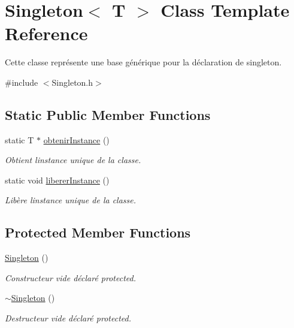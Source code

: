 \hypertarget{class_singleton}{}\section{Singleton$<$ T $>$ Class Template Reference}
\label{class_singleton}


Cette classe représente une base générique pour la déclaration de singleton.  




{\ttfamily \#include $<$Singleton.\+h$>$}

\subsection*{Static Public Member Functions}
\begin{DoxyCompactItemize}
\item 
static T $\ast$ \hyperlink{group__utilitaire_ga349c289d77c484b8b4a180843d968b46}{obtenir\+Instance} ()
\begin{DoxyCompactList}\small\item\em Obtient l\textquotesingle{}instance unique de la classe. \end{DoxyCompactList}\item 
static void \hyperlink{group__utilitaire_ga2b9ae943a004663d769be3f08ae35a0f}{liberer\+Instance} ()
\begin{DoxyCompactList}\small\item\em Libère l\textquotesingle{}instance unique de la classe. \end{DoxyCompactList}\end{DoxyCompactItemize}
\subsection*{Protected Member Functions}
\begin{DoxyCompactItemize}
\item 
\hypertarget{class_singleton_a923b995920da9c06590adb170ab2f890}{}\hyperlink{class_singleton_a923b995920da9c06590adb170ab2f890}{Singleton} ()\label{class_singleton_a923b995920da9c06590adb170ab2f890}

\begin{DoxyCompactList}\small\item\em Constructeur vide déclaré protected. \end{DoxyCompactList}\item 
\hypertarget{class_singleton_ac6e7af82cba33f561bd64e5e0243e7f8}{}\hyperlink{class_singleton_ac6e7af82cba33f561bd64e5e0243e7f8}{$\sim$\+Singleton} ()\label{class_singleton_ac6e7af82cba33f561bd64e5e0243e7f8}

\begin{DoxyCompactList}\small\item\em Destructeur vide déclaré protected. \end{DoxyCompactList}\end{DoxyCompactItemize}


